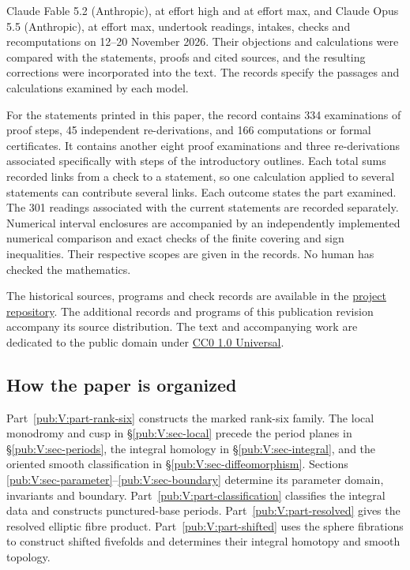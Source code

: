 \documentclass[11pt,a4paper]{article}
\numberwithin{equation}{section}
\theoremstyle{definition}
\newcommand{\SsixRepositoryCommit}{83d76022bcd442278b760db9ff438afceed6c6ea}
\begin{document}
Claude Fable 5.2 (Anthropic), at effort high and at effort max, and
Claude Opus 5.5 (Anthropic), at effort max, undertook readings, intakes,
checks and recomputations on 12--20 November 2026. Their objections
and calculations were compared with the statements, proofs and cited
sources, and the resulting corrections were incorporated into the text.
The records specify the passages and calculations examined by each model.

For the statements printed in this paper, the record contains
334 examinations of proof steps, 45 independent re-derivations, and
166 computations or formal certificates. It contains another eight
proof examinations and three re-derivations associated specifically
with steps of the introductory outlines. Each total sums recorded
links from a check to a statement, so one calculation applied to several
statements can contribute several links. Each outcome states the part
examined. The 301 readings associated with the current statements are
recorded separately. Numerical interval enclosures are accompanied by
an independently implemented numerical comparison and exact checks of
the finite covering and sign inequalities. Their respective scopes are
given in the records. No human has checked the mathematics.

The historical sources, programs and check records are available in the
\href{https://github.com/KokunoYumeto/s6-complex-structure-workbench/tree/\SsixRepositoryCommit/pro_returns/S6_SERIES_GRIND_checkpoint_10_20261120T0211Z/}{project repository}.
The additional records and programs of this publication revision
accompany its source distribution.
The text and accompanying work are dedicated to the public domain under
\href{https://creativecommons.org/publicdomain/zero/1.0/}{CC0 1.0 Universal}.

\subsection{How the paper is organized}
Part~\ref{pub:V:part-rank-six} constructs the marked rank-six family.
The local monodromy and cusp in \S\ref{pub:V:sec-local} precede the
period planes in \S\ref{pub:V:sec-periods}, the integral homology in
\S\ref{pub:V:sec-integral}, and the oriented smooth classification
in \S\ref{pub:V:sec-diffeomorphism}. Sections
\ref{pub:V:sec-parameter}--\ref{pub:V:sec-boundary} determine its
parameter domain, invariants and boundary.
Part~\ref{pub:V:part-classification} classifies the integral data and
constructs punctured-base periods. Part~\ref{pub:V:part-resolved}
gives the resolved elliptic fibre product. Part~\ref{pub:V:part-shifted}
uses the sphere fibrations to construct shifted fivefolds and determines
their integral homotopy and smooth topology.
\end{document}
